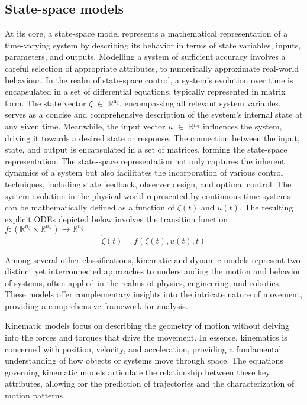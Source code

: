 \subsection{State-space models}
At its core, a state-space model represents a mathematical representation of a time-varying system by describing its behavior in terms of state variables, inputs, parameters, and outputs. Modelling a system of sufficient accuracy involves a careful selection of appropriate attributes, to numerically approximate real-world behaviour. In the realm of state-space control, a system's evolution over time is encapsulated in a set of differential equations, typically represented in matrix form. The state vector $\zeta$ $\in$ $\mathbb{R}$$\mathrm{^{n_{\zeta}}}$, encompassing all relevant system variables, serves as a concise and comprehensive description of the system's internal state at any given time. Meanwhile, the input vector $u$ $\in$ $\mathbb{R}$$\mathrm{^{n_{u}}}$ influences the system, driving it towards a desired state or response. The connection between the input, state, and output is encapsulated in a set of matrices, forming the state-space representation. The state-space representation not only captures the inherent dynamics of a system but also facilitates the incorporation of various control techniques, including state feedback, observer design, and optimal control.
The system evolution in the physical world represented by continuous time systems can be mathematically defined as a function of $\zeta(t)$ and $u(t)$. The resulting explicit \ac{ODE}s depicted below involves the transition function 
$f : (\mathbb{R}^{n_\zeta} \times \mathbb{R}^{n_u}) \to \mathbb{R}^{n_\zeta}$
\begin{equation}
    \dot{\zeta}(t) = f(\zeta(t),u(t),t) \label{sysODE}
\end{equation}

\par Among several other classifications, kinematic and dynamic models represent two distinct yet interconnected approaches to understanding the motion and behavior of systems, often applied in the realms of physics, engineering, and robotics. These models offer complementary insights into the intricate nature of movement, providing a comprehensive framework for analysis.

\par Kinematic models focus on describing the geometry of motion without delving into the forces and torques that drive the movement. In essence, kinematics is concerned with position, velocity, and acceleration, providing a fundamental understanding of how objects or systems move through space. The equations governing kinematic models articulate the relationship between these key attributes, allowing for the prediction of trajectories and the characterization of motion patterns.

